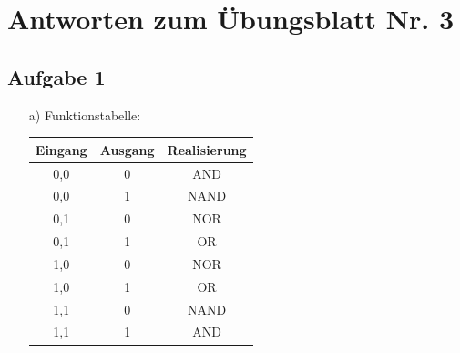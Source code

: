 \documentclass{scrartcl}
\begin{document}
	\section*{Antworten zum Übungsblatt Nr. 3}

	\subsection*{Aufgabe 1}
	\begin{itemize}
	\item[a)] Funktionstabelle:

		\begin{table}[h]

			\begin{tabular}{c|c|c}
				Eingang & Ausgang & Realisierung \\
				\hline
				0,0 & 0 & AND \\
				0,0 & 1 & NAND \\
				0,1 & 0 & NOR \\
				0,1 & 1 & OR \\
				1,0 & 0 & NOR \\
				1,0 & 1 & OR \\
				1,1 & 0 & NAND \\
				1,1 & 1 & AND \\


			\end{tabular}
		\end{table}

    \newpage


\end{itemize}
\end{document}
